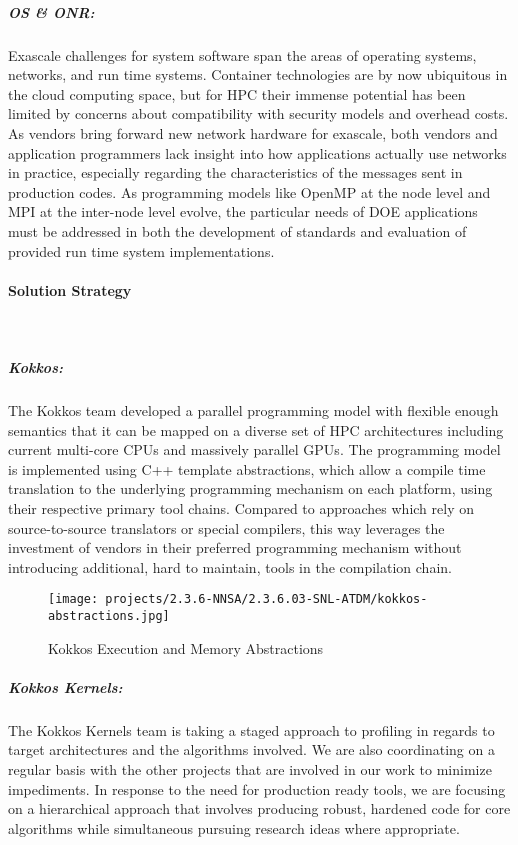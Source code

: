 \subparagraph{OS \& ONR:} Exascale challenges for system software span the areas of operating systems, networks, and run time systems.  Container technologies are by now ubiquitous in the cloud computing space, but for HPC their immense potential has been limited by concerns about compatibility with security models and overhead costs.  As vendors bring forward new network hardware for exascale, both vendors and application programmers lack insight into how applications actually use networks in practice, especially regarding the characteristics of the messages sent in production codes.  As programming models like OpenMP at the node level and MPI at the inter-node level evolve, the particular needs of DOE applications must be addressed in both the development of standards and evaluation of provided run time system implementations.



\paragraph{Solution Strategy} \leavevmode \\

\subparagraph{Kokkos: } The Kokkos team developed a parallel programming model with flexible enough semantics that it can be mapped on a diverse set of HPC architectures including current multi-core CPUs and massively parallel GPUs.
The programming model is implemented using C++ template abstractions, which allow a compile time translation to the underlying programming mechanism on each platform, using their respective primary tool chains.
Compared to approaches which rely on source-to-source translators or special compilers, this way leverages the investment of vendors in their preferred programming mechanism without introducing additional, hard to maintain, tools in the compilation chain.

\begin{figure}[ht!]
\centering
\texttt{[image: projects/2.3.6-NNSA/2.3.6.03-SNL-ATDM/kokkos-abstractions.jpg]}
\caption{Kokkos Execution and Memory Abstractions}
\end{figure}

\subparagraph{Kokkos Kernels:} The Kokkos Kernels team is taking a staged approach to profiling in regards to target architectures and the algorithms involved. We are also coordinating on a regular basis with the other projects that are involved in our work to minimize impediments. In response to the need for production ready tools, we are focusing on a hierarchical approach that involves producing robust, hardened code for core algorithms while simultaneous pursuing research ideas where appropriate. 
 
